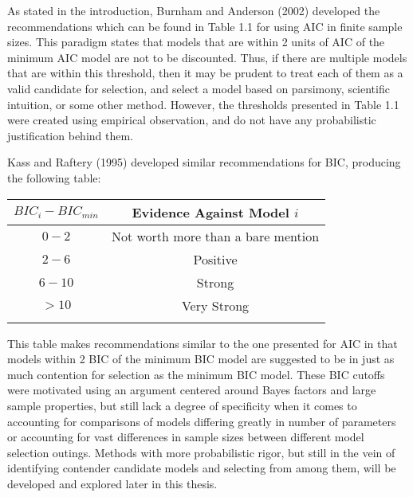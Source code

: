 		As stated in the introduction, Burnham and Anderson (2002) developed the recommendations which can be found in Table 1.1 for using AIC in finite sample sizes. This paradigm states that models
		that are within 2 units of AIC of the minimum AIC model are not to be discounted. Thus, if there are multiple models that are within this threshold, then it may be prudent to treat each of them
		as a valid candidate for selection, and select a model based on parsimony, scientific intuition, or some other method. However, the thresholds presented in Table 1.1 were created using empirical
		observation, and do not have any probabilistic justification behind them.

		Kass and Raftery (1995) developed similar recommendations for BIC, producing the following table:
		\begin{table}[h]
		\centering
		{
		\begin{tabular}{ c|c}
		$BIC_{i}-BIC_{min}$ & Evidence Against Model $i$\\
		 \hline
		 $0 - 2$ & Not worth more than a bare mention\\
		 $2 - 6$ & Positive\\
		 $6 - 10$ & Strong\\
		 $> 10$ & Very Strong\\
		 \Xhline{3\arrayrulewidth}
		\end{tabular}
		}
		\end{table}
		This table makes recommendations similar to the one presented for AIC in that models within 2 BIC of the minimum BIC model are suggested to be in just as much contention for selection as
		the minimum BIC model. These BIC cutoffs were motivated using an argument centered around Bayes factors and large sample properties, but still lack a degree of specificity when it comes 
		to accounting for comparisons of models differing greatly in number of parameters or accounting for vast differences in sample sizes between different model selection outings. Methods with
		more probabilistic rigor, but still in the vein of identifying contender candidate models and selecting from among them, will be developed and explored later in this thesis.

